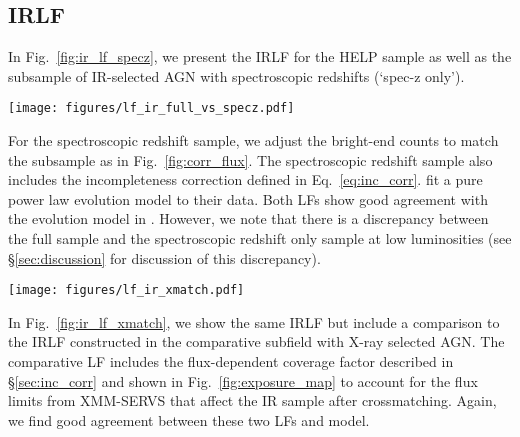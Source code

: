 \documentclass[twocolumn, trackchanges]{aastex63}
\begin{document}
\subsection{IRLF}
In Fig.~\ref{fig:ir_lf_specz}, we present the IRLF for the HELP sample as well as the subsample of IR-selected AGN with spectroscopic redshifts (`spec-z only').
\begin{figure*}[hptb]
\centering
\texttt{[image: figures/lf\_ir\_full\_vs\_specz.pdf]}
\caption{IRLF constructed using the HELP catalog with uncertainties estimated by MC of N=10000. The IRLF constructed using only spectroscopic redshifts is also shown. The 68\% confidence interval of the \cite{lacy_spitzer_2015} parametric IRLF is shown for comparison--the lighter colored, hatched region shows where \cite{lacy_spitzer_2015} extrapolated their model; darker grey indicates the redshift and luminosity intervals supported by the data to construct their LF;. Our sample reaches higher redshifts and lower luminosities than the \cite{lacy_spitzer_2015} sample.  We note good agreement with these previous results. However, at higher redshift there is indication of a low-end luminosity flattening of the LF. This is not in contradiction of the \cite{lacy_spitzer_2015} results because their sample did not include such luminous AGN at high redshift (i.e. their  model has been  extrapolated to these redshifts).}
\label{fig:ir_lf_specz}
\end{figure*}
For the spectroscopic redshift sample, we adjust the \cite{barmby_catalog_2008} bright-end counts to match the subsample as in Fig.~\ref{fig:corr_flux}.
The spectroscopic redshift sample also includes the incompleteness correction defined in Eq.~\ref{eq:inc_corr}.
\cite{lacy_spitzer_2015} fit a pure power law evolution model to their data.
Both LFs show good agreement with the evolution model in \cite{lacy_spitzer_2015}.
However, we note that there is a discrepancy between the full sample and the spectroscopic redshift only sample at low luminosities (see \S\ref{sec:discussion} for discussion of this discrepancy).

\begin{figure*}[hptb]
\centering
\texttt{[image: figures/lf\_ir\_xmatch.pdf]}
\caption{IRLF as described in Fig.~\ref{fig:ir_lf_specz}. Here we plot the LF constructed using the comparative sample of X-ray selected AGN in comparison to the full AGN sample.}
\label{fig:ir_lf_xmatch}
\end{figure*}

In Fig.~\ref{fig:ir_lf_xmatch}, we show the same IRLF but include a comparison to the IRLF constructed in the comparative subfield with X-ray selected AGN.
The comparative LF includes the flux-dependent coverage factor described in \S\ref{sec:inc_corr} and shown in Fig.~\ref{fig:exposure_map} to account for the flux limits from XMM-SERVS that affect the IR sample after crossmatching.
Again, we find good agreement between these two LFs and \cite{lacy_spitzer_2015} model.
\end{document}
